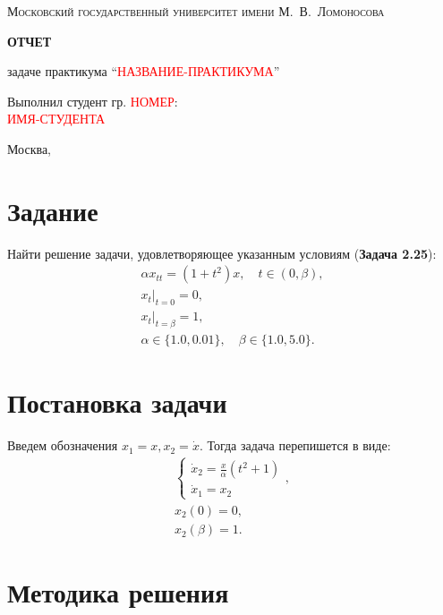 \documentclass[a4paper,12pt]{article}
\newcommand{\UpdateMe}[1]{\textcolor{red}{#1}}
\newcommand{\University}{Московский государственный университет имени М.~В.~Ломоносова}
\newcommand{\Department}{Кафедра \UpdateMe{НАЗВАНИЕ-КАФЕДРЫ}}
\newcommand{\Student}{\UpdateMe{ИМЯ-СТУДЕНТА}}
\newcommand{\GroupNum}{\UpdateMe{НОМЕР}}
\newcommand{\Seminar}{\UpdateMe{НАЗВАНИЕ-ПРАКТИКУМА}}
\begin{document}
\begin{titlepage}
  \centering
  {\scshape\Large \University\par}\vspace{1cm}{\scshape\large \Department\par}
  \vfill
  {\huge\bfseries ОТЧЕТ\par}{ задаче практикума \enquote{\Seminar}\par}
  \vfill
  \hfill\begin{minipage}{0.45\linewidth}Выполнил студент гр. \GroupNum:\\\Student\end{minipage}
  \vfill
  {\large Москва, \the\year{}\par}
\end{titlepage}

\section*{Задание}
Найти решение задачи, удовлетворяющее указанным условиям ({\bfseries Задача 2.25}):
\begin{gather*}
  \alpha x_{tt}=\left(1+t^2\right)x, \quad t\in(0, \beta),\\
  \left.x_{t}\right\vert_{t=0}=0,\\
  \left.x_{t}\right\vert_{t=\beta}=1,\\
  \alpha \in \{1.0, 0.01\}, \quad \beta \in \{1.0, 5.0\}.
\end{gather*}

\section*{Постановка задачи}

Введем обозначения \(x_1 = x, x_2=\dot{x}\). Тогда задача перепишется в виде:
\begin{gather}
  \label{common_system} \begin{cases}\dot{x}_2=\frac{x}{\alpha}\left(t^2+1\right)\\ \dot{x}_1=x_2 \end{cases},\\
  \label{left_conditions} x_2(0)=0,\\
  \label{right_conditions} x_2(\beta)=1.
\end{gather}

\section*{Методика решения}
\end{document}
